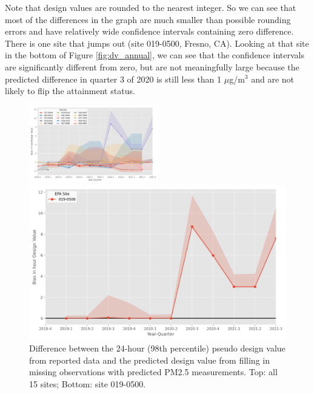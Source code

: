 \documentclass[12pt]{article}
\begin{document}
Note that design values are rounded to the nearest integer. So we can see that most of the differences in the graph are much smaller than possible rounding errors and have relatively wide confidence intervals containing zero difference. There is one site that jumps out (site 019-0500, Fresno, CA). Looking at that site in the bottom of Figure \ref{fig:dv_annual}, we can see that the confidence intervals are significantly different from zero, but are not meaningfully large because the predicted difference in quarter 3 of 2020 is still less than 1 $\mu$g/m$^3$ and are not likely to flip the attainment status.

\FloatBarrier
\begin{figure}
    \centering
    \includegraphics[width=0.5\textwidth]{output/figures/final_results/DV_hour_plot_all_test_sites.png}
    \smallskip\par
    \includegraphics[width=\linewidth]{output/figures/final_results/DV_hour_plot_site_019-0500.png}
    \caption{Difference between the 24-hour (98th percentile) pseudo design value from reported data and the predicted design value from filling in missing observations with predicted PM2.5 measurements. Top: all 15 sites; Bottom: site 019-0500.}
    \label{fig:dv_hour}
\end{figure}
\end{document}
